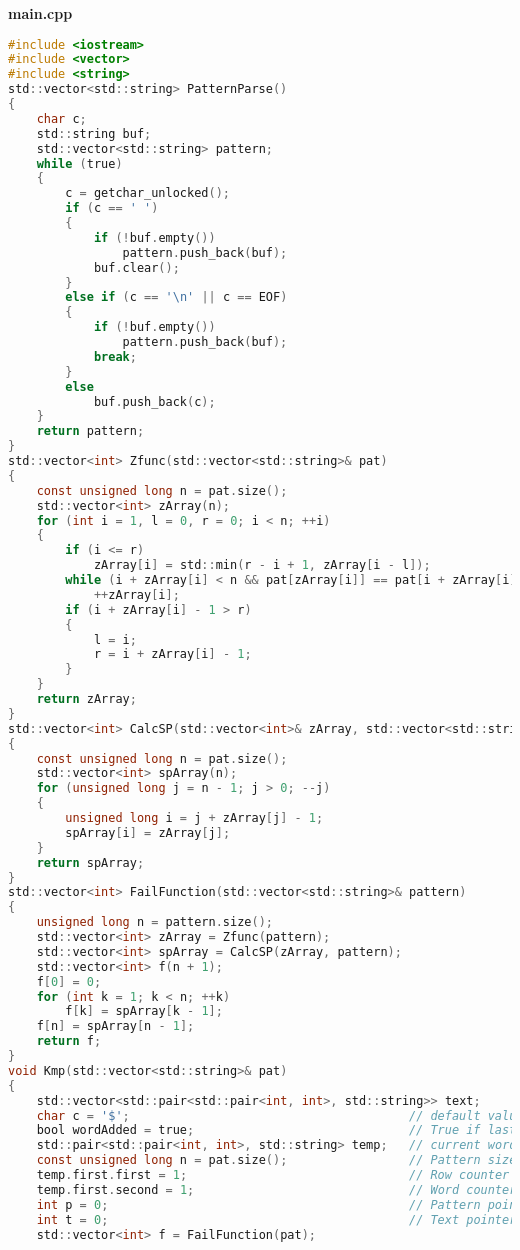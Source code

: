 \textbf{main.cpp}
\begin{lstlisting}[language=C]
#include <iostream>
#include <vector>
#include <string>
std::vector<std::string> PatternParse() 
{
    char c;
    std::string buf;
    std::vector<std::string> pattern;
    while (true) 
    {
        c = getchar_unlocked();
        if (c == ' ') 
        {
            if (!buf.empty())
                pattern.push_back(buf);
            buf.clear();
        }
        else if (c == '\n' || c == EOF) 
        {
            if (!buf.empty())
                pattern.push_back(buf);
            break;
        }
        else
            buf.push_back(c);
    }
    return pattern;
}
std::vector<int> Zfunc(std::vector<std::string>& pat) 
{
    const unsigned long n = pat.size();
    std::vector<int> zArray(n);
    for (int i = 1, l = 0, r = 0; i < n; ++i) 
    {
        if (i <= r)
            zArray[i] = std::min(r - i + 1, zArray[i - l]);
        while (i + zArray[i] < n && pat[zArray[i]] == pat[i + zArray[i]])
            ++zArray[i];
        if (i + zArray[i] - 1 > r) 
        {
            l = i; 
            r = i + zArray[i] - 1;
        }
    }
    return zArray;
}
std::vector<int> CalcSP(std::vector<int>& zArray, std::vector<std::string>& pat) 
{
    const unsigned long n = pat.size();
    std::vector<int> spArray(n);
    for (unsigned long j = n - 1; j > 0; --j) 
    {
        unsigned long i = j + zArray[j] - 1;
        spArray[i] = zArray[j];
    }
    return spArray;
}
std::vector<int> FailFunction(std::vector<std::string>& pattern) 
{
    unsigned long n = pattern.size();
    std::vector<int> zArray = Zfunc(pattern);
    std::vector<int> spArray = CalcSP(zArray, pattern);
    std::vector<int> f(n + 1);
    f[0] = 0;
    for (int k = 1; k < n; ++k) 
        f[k] = spArray[k - 1];
    f[n] = spArray[n - 1];
    return f;
}
void Kmp(std::vector<std::string>& pat) 
{
    std::vector<std::pair<std::pair<int, int>, std::string>> text;
    char c = '$';                                       // default value
    bool wordAdded = true;                              // True if last action was to add the word into the vector
    std::pair<std::pair<int, int>, std::string> temp;   // current word
    const unsigned long n = pat.size();                 // Pattern size
    temp.first.first = 1;                               // Row counter
    temp.first.second = 1;                              // Word counter
    int p = 0;                                          // Pattern pointer
    int t = 0;                                          // Text pointer
    std::vector<int> f = FailFunction(pat);

\end{lstlisting}
